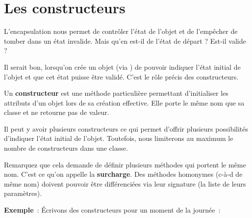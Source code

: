 \section{Les constructeurs}

	L'encapsulation nous permet de contrôler
	l'état de l'objet et de
	l'empêcher de tomber dans un état invalide. Mais
	qu'en est-il de l'état de départ ?
	Est-il valide ?
	
	Il serait bon, lorsqu'on crée un objet (via
	) de pouvoir indiquer l'état
	initial de l'objet et que cet état puisse être validé.
	C'est le rôle précis des constructeurs.
	
	Un \textbf{constructeur} est une méthode particulière permettant
	d'initialiser les attributs d'un
	objet lors de sa création effective. Elle porte le même nom que sa
	classe et ne retourne pas de valeur.
	
	Il peut y avoir plusieurs constructeurs ce qui permet
	d'offrir plusieurs possibilités d'indiquer l'état initial de
	l'objet. Toutefois, nous limiterons au maximum le nombre 
	de constructeurs dans une classe.
	
	Remarquez que cela demande de définir plusieurs méthodes 
	qui portent le même nom. C'est ce qu'on appelle la
	\textbf{surcharge}. Des méthodes homonymes (c-à-d de même nom) doivent
	pouvoir être différenciées via leur signature (la liste de leurs
	paramètres).

	\textbf{Exemple}~:
	Écrivons des constructeurs pour un moment de la journée~:

	
